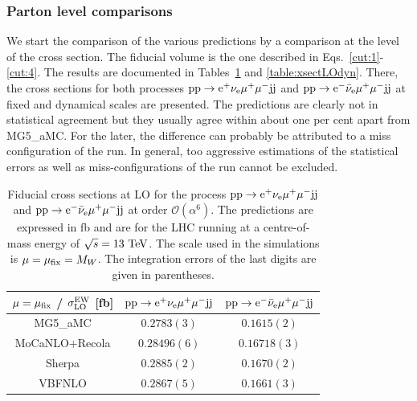 \subsubsection*{Parton level comparisons}

We start the comparison of the various predictions by a comparison at the level of the cross section.
The fiducial volume is the one described in Eqs.~\eqref{cut:1}-\eqref{cut:4}.
The results are documented in Tables~\ref{table:xsectLOfix} and \ref{table:xsectLOdyn}.
There, the cross sections for both processes ${\rm p} {\rm p} \to {\rm e}^+  \nu_{\rm e}  \mu^+ \mu^- {\rm j} {\rm j}$ and ${\rm p} {\rm p} \to {\rm e}^-  \bar \nu_{\rm e}  \mu^+ \mu^- {\rm j} {\rm j}$ at fixed and dynamical scales are presented.
The predictions are clearly not in statistical agreement but they usually agree within about one per cent apart from {\sc MG5\_aMC}.
For the later, the difference can probably be attributed to a miss configuration of the run.
In general, too aggressive estimations of the statistical errors as well as miss-configurations of the run cannot be excluded.

\begin{table}
\begin{center} 
\begin{tabular}{ c | c | c }
 $\mu = \mu_{\rm fix}$ / $\sigma_{\rm LO}^{\rm EW}$ [fb] & ${\rm p} {\rm p} \to {\rm e}^+  \nu_{\rm e}  \mu^+ \mu^- {\rm j} {\rm j}$  & ${\rm p} {\rm p} \to {\rm e}^-  \bar \nu_{\rm e}  \mu^+ \mu^- {\rm j} {\rm j}$  \\
  \hline\hline
  {\sc MG5\_aMC}                  & $0.2783(3)$     & $0.1615(2)$   \\
  {\sc MoCaNLO}+{\sc Recola}      & $0.28496(6)$    & $0.16718(3)$  \\
  {\sc Sherpa}                    & $0.2885(2)$     & $0.1670(2)$   \\
  {\sc VBFNLO}                    & $0.2867(5)$     & $0.1661(3)$   \\
  \hline
\end{tabular}
\end{center}
\caption{
Fiducial cross sections at LO for the process ${\rm p}{\rm p}\to{\rm e}^+\nu_{\rm e}\mu^+\mu^-{\rm j}{\rm j}$ and ${\rm p}{\rm p}\to{\rm e}^-\bar\nu_{\rm e}\mu^+\mu^-{\rm j}{\rm j}$ at order $\mathcal{O} (\alpha^6)$.
The predictions are expressed in fb and are for the LHC running at a centre-of-mass energy of $\sqrt{s}=13 {\rm~TeV}$.
The scale used in the simulations is $\mu = \mu_{\rm fix} = M_W$.
The integration errors of the last digits are given in parentheses.}
\label{table:xsectLOfix}
\end{table}

